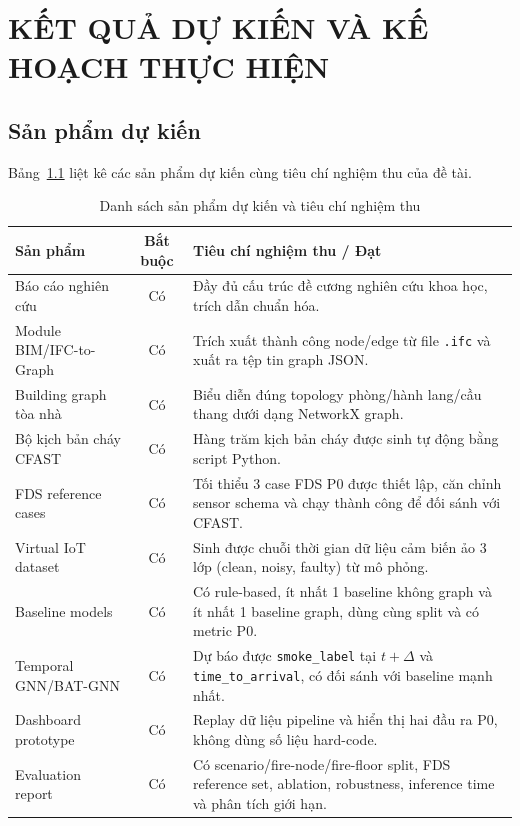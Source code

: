 
\chapter{KẾT QUẢ DỰ KIẾN VÀ KẾ HOẠCH THỰC HIỆN}
\label{chap:kehoach}

\section{Sản phẩm dự kiến}
\label{sec:sanpham}

Bảng~\ref{tab:deliverables} liệt kê các sản phẩm dự kiến cùng tiêu chí nghiệm thu của đề tài.

\begin{table}[H]
\centering
\caption{Danh sách sản phẩm dự kiến và tiêu chí nghiệm thu}
\label{tab:deliverables}
\begin{tabularx}{\textwidth}{l c X}
\toprule
\textbf{Sản phẩm} & \textbf{Bắt buộc} & \textbf{Tiêu chí nghiệm thu / Đạt} \\
\midrule
Báo cáo nghiên cứu & Có & Đầy đủ cấu trúc đề cương nghiên cứu khoa học, trích dẫn chuẩn hóa. \\
Module BIM/IFC-to-Graph & Có & Trích xuất thành công node/edge từ file \texttt{.ifc} và xuất ra tệp tin graph JSON. \\
Building graph tòa nhà & Có & Biểu diễn đúng topology phòng/hành lang/cầu thang dưới dạng NetworkX graph. \\
Bộ kịch bản cháy CFAST & Có & Hàng trăm kịch bản cháy được sinh tự động bằng script Python. \\
FDS reference cases & Có & Tối thiểu 3 case FDS P0 được thiết lập, căn chỉnh sensor schema và chạy thành công để đối sánh với CFAST. \\
Virtual IoT dataset & Có & Sinh được chuỗi thời gian dữ liệu cảm biến ảo 3 lớp (clean, noisy, faulty) từ mô phỏng. \\
Baseline models & Có & Có rule-based, ít nhất 1 baseline không graph và ít nhất 1 baseline graph, dùng cùng split và có metric P0. \\
Temporal GNN/BAT-GNN & Có & Dự báo được \texttt{smoke\_label} tại $t+\Delta$ và \texttt{time\_to\_arrival}, có đối sánh với baseline mạnh nhất. \\
Dashboard prototype & Có & Replay dữ liệu pipeline và hiển thị hai đầu ra P0, không dùng số liệu hard-code. \\
Evaluation report & Có & Có scenario/fire-node/fire-floor split, FDS reference set, ablation, robustness, inference time và phân tích giới hạn. \\
\bottomrule
\end{tabularx}
\end{table}

